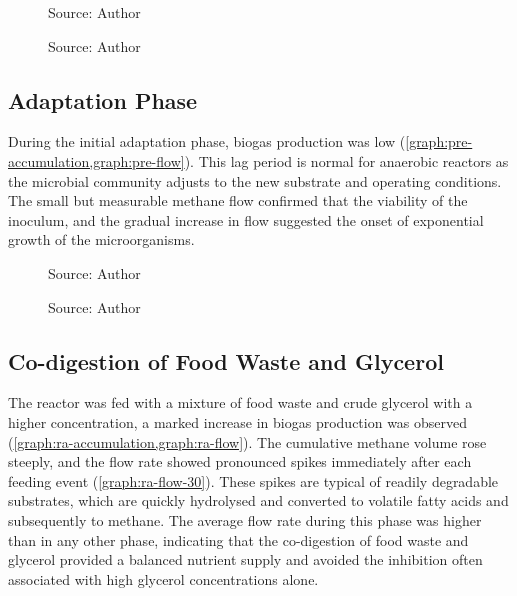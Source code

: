 \begin{figure}[H]
    \centering
    \caption{Source: Author}
    \label{graph:total-accumulation}
\end{figure}

\begin{figure}[H]
    \centering
    \caption{Source: Author}
    \label{graph:total-flow}
\end{figure}

\subsection{Adaptation Phase}
\label{subsec:adaptation_phase}

During the initial adaptation phase, biogas production was low (\cref{graph:pre-accumulation,graph:pre-flow}). This lag period is normal for anaerobic reactors as the microbial community adjusts to the new substrate and operating conditions. The small but measurable methane flow confirmed that the viability of the inoculum, and the gradual increase in flow suggested the onset of exponential growth of the microorganisms.

\begin{figure}[H]
    \centering
    \caption{Source: Author}
    \label{graph:pre-accumulation}
\end{figure}

\begin{figure}[H]
    \centering
    \caption{Source: Author}
    \label{graph:pre-flow}
\end{figure}

\subsection{Co-digestion of Food Waste and Glycerol}
\label{subsec:codigestion_phase}

The reactor was fed with a mixture of food waste and crude glycerol with a higher concentration, a marked increase in biogas production was observed (\cref{graph:ra-accumulation,graph:ra-flow}). The cumulative methane volume rose steeply, and the flow rate showed pronounced spikes immediately after each feeding event (\cref{graph:ra-flow-30}). These spikes are typical of readily degradable substrates, which are quickly hydrolysed and converted to volatile fatty acids and subsequently to methane. The average flow rate during this phase was higher than in any other phase, indicating that the co-digestion of food waste and glycerol provided a balanced nutrient supply and avoided the inhibition often associated with high glycerol concentrations alone.

